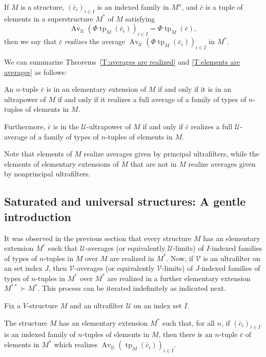 \documentclass{scrartcl}
\DeclareMathOperator{\Av}{Av }
\DeclareMathOperator{\tp}{tp}
\newcommand{\SU}{\mathscr{U}}
\newcommand{\SV}{\mathscr{V}}
\begin{document}
\begin{definition}
\label{D:type realization}
If $M$ is a structure, $(\bar{c}_i)_{i\in I}$ is an indexed family in $M^n$, and $\bar{c}$ is a tuple of elements in a superstructure $M^*$ of $M$ satisfying
\[
\Av_{\SU} (\Phi\tp_M(\bar c_i))_{i\in I}= \Phi\tp_{M}(\bar{c}),
\]
then we say that $\bar{c}$ \emph{realizes} the average $\Av_{\SU} (\Phi\tp_M(\bar c_i))_{i\in I}$ in $M^*$.
\end{definition}

We can summarize Theorems~\ref{T:averages are realized} and \ref{T:elements are averages} as follows:


\begin{corollary}
An $n$-tuple $\bar c$ is in an elementary extension of $M$ if and only if it is in an ultrapower of $M$ if and only if it realizes a full average of a family of types of $n$-tuples of elements in $M$.

Furthermore, $\bar c$ is in the $\SU$-ultrapower of $M$ if and only if $\bar c$ realizes a full $\SU$-average  of a family of types of $n$-tuples of elements in $M$.
\end{corollary}

Note that elements of $M$ realize averages given by principal ultrafilters, while the elements of elementary extensions of $M$ that are not in $M$ realize averages given by nonprincipal ultrafilters.

\subsection{Saturated and universal structures: A gentle introduction}

It was observed in the previous section that every structure $M$ has an elementary extension $M^*$ such that $\SU$-averages (or equivalently $\SU$-limits) of $I$-indexed families of types of $n$-tuples in $M$ over $M$ are realized in $M^*$. Now, if $\SV$ is an ultrafilter on an set index $J$, then $\SV$-averages (or equivalently $\SV$-limits) of $J$-indexed families of types of $n$-tuples in $M^*$ over $M^*$ are realized in a further elementary extension $M^{**}\succ M^*$. This process can be iterated indefinitely as indicated next.

Fix a $V$-structure $M$ and an ultrafilter $\SU$ on an index set $I$.

\begin{lemma}
\label{T:all averages are realized}
The structure $M$ has an elementary extension $M^*$ such that, for all $n$, if $(\bar{c}_i)_{i\in I}$ is an indexed family of $n$-tuples of elements in $M$, then there is an $n$-tuple $\bar{c}$ of elements in $M^*$ which realizes $\Av_\SU(\tp_M(\bar{c}_i))_{i\in I}$.
\end{lemma}
\end{document}
